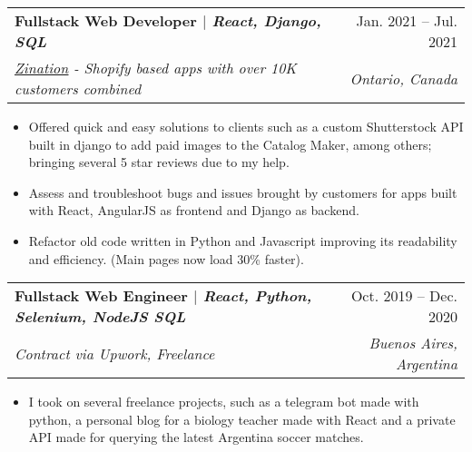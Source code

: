 \documentclass[letterpaper,11pt]{article}
\makeatletter
\newcommand{\resumeItem}[1]{
  \item\small{
    {#1 \vspace{-2pt}}
  }
}
\newcommand{\resumeSubheading}[4]{
  \vspace{-2pt}\item
    \begin{tabular*}{0.97\textwidth}[t]{l@{\extracolsep{\fill}}r}
      \textbf{#1} & #2 \\
      \textit{\small#3} & \textit{\small #4} \\
    \end{tabular*}\vspace{-7pt}
}
\newcommand{\resumeSubSubheading}[2]{
    \item
    \begin{tabular*}{0.97\textwidth}{l@{\extracolsep{\fill}}r}
      \textit{\small#1} & \textit{\small #2} \\
    \end{tabular*}\vspace{-7pt}
}
\newcommand{\resumeSubHeadingListEnd}{\end{itemize}}
\newcommand{\resumeItemListStart}{\begin{itemize}}
\newcommand{\resumeItemListEnd}{\end{itemize}\vspace{-5pt}}
\makeatother
\begin{document}
    \resumeSubheading
      {Fullstack Web Developer $|$ \normalfont \emph{React, Django, SQL}}{Jan. 2021 -- Jul. 2021}
      {\href{https://www.linkedin.com/company/zination/}{\underline{Zination}} - Shopify based apps with over 10K customers combined}{Ontario, Canada}
      \resumeItemListStart
        \resumeItem{Offered quick and easy solutions to clients such as a custom Shutterstock API built in django to add paid images to the Catalog Maker, among others; bringing several 5 star reviews due to my help.}
        \resumeItem{Assess and troubleshoot bugs and issues brought by customers for apps built with React, AngularJS as frontend and Django as backend.}
        \resumeItem{Refactor old code written in Python and Javascript improving its readability and efficiency. (Main pages now load 30\% faster).}
      \resumeItemListEnd

    \resumeSubheading
     {Fullstack Web Engineer $|$ \normalfont \emph{React, Python, Selenium, NodeJS SQL}}{Oct. 2019 -- Dec. 2020}
      {Contract via Upwork, Freelance}{Buenos Aires, Argentina}
      \resumeItemListStart
        \resumeItem{I took on several freelance projects, such as a telegram bot made with python, a personal blog for a biology teacher made with React and a private API made for querying the latest Argentina soccer matches.}%


      \resumeItemListEnd

      
\end{document}
